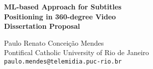\documentclass[11pt]{article}
\begin{document}
\LARGE


\begin{center}
{\bf ML-based Approach for Subtitles\\Positioning in 360-degree Video
\Large
\\Dissertation Proposal}
\end{center}


\bigskip
\normalsize

\begin{flushright}

Paulo Renato Conceição Mendes\\
Pontifical Catholic University of Rio de Janeiro\\
\texttt{paulo.mendes@telemidia.puc-rio.br}
\end{flushright}


\date{}


\thispagestyle{empty}

%
%

{} \setcounter{page}{-1}

\tableofcontents

\newpage
{} \setcounter{page}{1}







\newpage


% 

\end{document}
